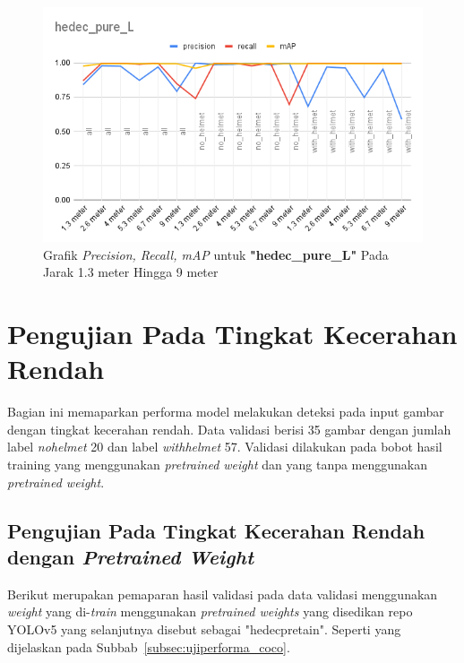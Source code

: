 \begin{enumerate}
  \begin{figure}[ht]
    \centering
    \includegraphics[width=1\textwidth]{gambar/BerdasarkanJarak/hedec_pure_L.png}
    \caption{Grafik \emph{Precision, Recall, mAP} untuk \textbf{"hedec\_pure\_L"} Pada Jarak 1.3 meter Hingga 9 meter}
    \label{fig:grafvaljarak_hedec_pure_L}  
  \end{figure}



\end{enumerate}




\section{Pengujian Pada Tingkat Kecerahan Rendah}
\label{sec:pengujianberdasarkantingkatkeceharan}

\par Bagian ini memaparkan performa model melakukan
deteksi pada input gambar dengan tingkat kecerahan rendah. Data validasi berisi
35 gambar dengan jumlah label \emph{no\textunderscore helmet} 20 dan label \emph{with\textunderscore helmet} 57.
Validasi dilakukan pada bobot hasil training yang menggunakan \textit{pretrained weight} dan yang tanpa menggunakan \textit{pretrained weight}. 

\subsection{Pengujian Pada Tingkat Kecerahan Rendah dengan \emph{Pretrained Weight}}
\label{subsec:lowlight_pretrained}

\par Berikut merupakan pemaparan hasil validasi pada data validasi menggunakan \emph{weight} yang di-\emph{train} menggunakan
\emph{pretrained weights} yang disedikan repo YOLOv5 yang selanjutnya disebut sebagai "hedec\textunderscore pretain". 
Seperti yang dijelaskan pada Subbab~\ref{subsec:ujiperforma_coco}. 


